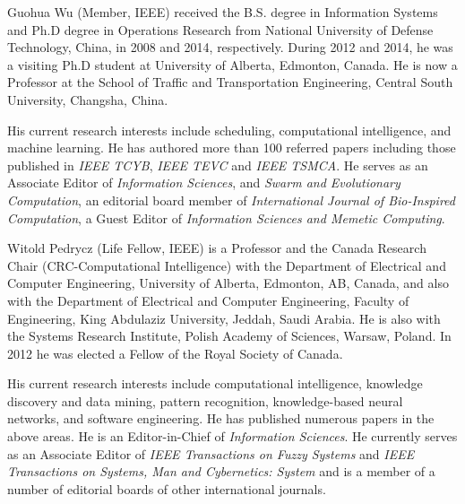 \documentclass[lettersize,journal]{IEEEtran}
\begin{document}
	\begin{IEEEbiography}{Guohua Wu} (Member, IEEE) {\space}
		received the B.S. degree in Information Systems and Ph.D degree in Operations Research from National University of Defense Technology, China, in 2008 and 2014, respectively. During 2012 and 2014, he was a visiting Ph.D student at University of Alberta, Edmonton, Canada. He is now a Professor at the School of Traffic and Transportation Engineering, Central South University, Changsha, China. 
		
		His current research interests include scheduling, computational intelligence, and machine learning. He has authored more than 100 referred papers including those published in \textit{IEEE TCYB}, \textit{IEEE TEVC} and \textit{IEEE TSMCA}. He serves as an Associate Editor of \textit{Information Sciences}, and \textit{Swarm and Evolutionary Computation}, an editorial board member of \textit{International Journal of Bio-Inspired Computation}, a Guest Editor of \textit{Information Sciences and Memetic Computing}. 
	\end{IEEEbiography}
	
	
	\begin{IEEEbiography}{Witold Pedrycz} (Life Fellow, IEEE) {\space}
		is a Professor and the Canada Research Chair (CRC-Computational Intelligence) with the Department of Electrical and Computer Engineering, University of Alberta, Edmonton, AB, Canada, and also with the Department of Electrical and Computer Engineering, Faculty of Engineering, King Abdulaziz University, Jeddah, Saudi Arabia. He is also with the Systems Research Institute, Polish Academy of Sciences, Warsaw, Poland. In 2012 he was elected a Fellow of the Royal Society of Canada. 
		
		His current research interests include computational intelligence, knowledge discovery and data mining, pattern recognition, knowledge-based neural networks, and software engineering. He has published numerous papers in the above areas. He is an Editor-in-Chief of \textit{Information Sciences}. He currently serves as an Associate Editor of \textit{IEEE Transactions on Fuzzy Systems} and \textit{IEEE Transactions on Systems, Man and Cybernetics: System} and is a member of a number of editorial boards of other international journals.
	\end{IEEEbiography}
	
	\vfill
	
\end{document}
